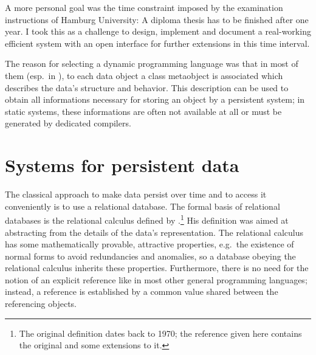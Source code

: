 \documentclass[a4paper%
]{article}
\begin{document}
%
A more personal goal was the time constraint imposed by the
examination instructions of Hamburg University: A diploma thesis has
to be finished after one year. I took this as a challenge to design,
implement and document a real-working efficient system with an open
interface for further extensions in this time interval.
%
\par{}The reason for selecting a dynamic programming language was that
in most of them (esp.\ in \clos), to each data object a class
metaobject is associated which describes the data's structure and
behavior. This description can be used to obtain all informations
necessary for storing an object by a persistent system; in static
systems, these informations are often not available at all or must be
generated by dedicated compilers.
%
\section{Systems for persistent data}
%
The classical approach to make data persist over time and to access it
conveniently is to use a relational database. The formal basis of
relational databases is the relational calculus defined by
\cite{bib:co79}.\footnote{The original definition dates back to 1970;
the reference given here contains the original and some extensions to
it.} His definition was aimed 
at abstracting
from the details of the data's representation.  The
relational calculus has some mathematically provable, attractive
properties, e.g.\ the existence of normal forms to avoid redundancies
and anomalies, so a database obeying the relational calculus inherits
these properties. Furthermore, there is no need for the notion of an
explicit reference like in most other general programming languages;
instead, a reference is established by a common value shared between
the referencing objects.
%
\end{document}

